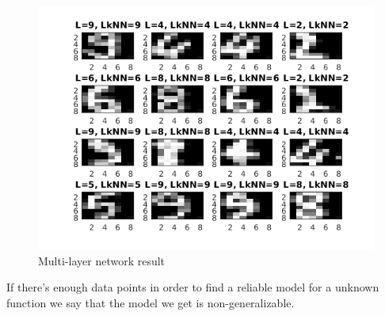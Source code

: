 \documentclass[a4paper,12pt]{article}
\begin{document}
\begin{figure}[H]
\centering
  \begin{minipage}[]{1\textwidth}
  \caption{Multi-layer network result}\label{fig:multi_4_test}
  \includegraphics[width=\textwidth]{figures/multi_4_test.png}
  \end{minipage}
\end{figure}


If there's enough data points in order to find a reliable model for a unknown function we say that the model we get is non-generalizable. 
\end{document}
